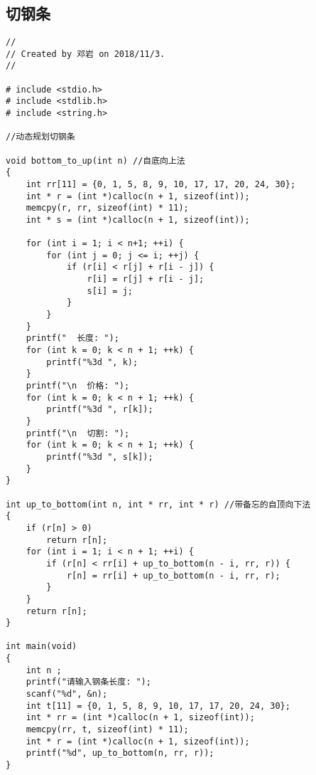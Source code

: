 \section{\color[rgb]{0.2,0.4,0.6}{动态规划}}
\subsection{切钢条}
\begin{verbatim}
//
// Created by 邓岩 on 2018/11/3.
//

# include <stdio.h>
# include <stdlib.h>
# include <string.h>

//动态规划切钢条

void bottom_to_up(int n) //自底向上法
{
    int rr[11] = {0, 1, 5, 8, 9, 10, 17, 17, 20, 24, 30};
    int * r = (int *)calloc(n + 1, sizeof(int));
    memcpy(r, rr, sizeof(int) * 11);
    int * s = (int *)calloc(n + 1, sizeof(int));

    for (int i = 1; i < n+1; ++i) {
        for (int j = 0; j <= i; ++j) {
            if (r[i] < r[j] + r[i - j]) {
                r[i] = r[j] + r[i - j];
                s[i] = j;
            }
        }
    }
    printf("  长度: ");
    for (int k = 0; k < n + 1; ++k) {
        printf("%3d ", k);
    }
    printf("\n  价格: ");
    for (int k = 0; k < n + 1; ++k) {
        printf("%3d ", r[k]);
    }
    printf("\n  切割: ");
    for (int k = 0; k < n + 1; ++k) {
        printf("%3d ", s[k]);
    }
}

int up_to_bottom(int n, int * rr, int * r) //带备忘的自顶向下法
{
    if (r[n] > 0)
        return r[n];
    for (int i = 1; i < n + 1; ++i) {
        if (r[n] < rr[i] + up_to_bottom(n - i, rr, r)) {
            r[n] = rr[i] + up_to_bottom(n - i, rr, r);
        }
    }
    return r[n];
}

int main(void)
{
    int n ;
    printf("请输入钢条长度: ");
    scanf("%d", &n);
    int t[11] = {0, 1, 5, 8, 9, 10, 17, 17, 20, 24, 30};
    int * rr = (int *)calloc(n + 1, sizeof(int));
    memcpy(rr, t, sizeof(int) * 11);
    int * r = (int *)calloc(n + 1, sizeof(int));
    printf("%d", up_to_bottom(n, rr, r));
}
\end{verbatim}

